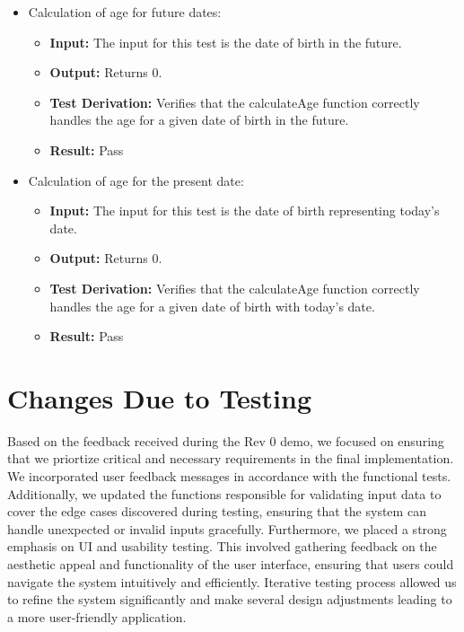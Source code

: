 \documentclass[12pt, titlepage]{article}
\begin{document}
\begin{itemize}
    \item Calculation of age for future dates:
      \begin{itemize}
        \item \textbf{Input:} The input for this test is the date of birth in the future.    
        \item \textbf{Output:} Returns 0.
        \item \textbf{Test Derivation:} Verifies that the calculateAge function correctly handles the age for a given date of birth in the future.
        \item \textbf{Result:} Pass
      \end{itemize}

    \item Calculation of age for the present date:
      \begin{itemize}
        \item \textbf{Input:} The input for this test is the date of birth representing today's date.    
        \item \textbf{Output:} Returns 0.
        \item \textbf{Test Derivation:} Verifies that the calculateAge function correctly handles the age for a given date of birth with today's date.
        \item \textbf{Result:} Pass
      \end{itemize}
  \end{itemize}


\section{Changes Due to Testing}

Based on the feedback received during the Rev 0 demo, we focused on ensuring that we priortize critical and necessary requirements in the final implementation. We incorporated user feedback messages in accordance with the functional tests. Additionally, we updated the functions responsible for validating input data to cover the edge cases discovered during testing, ensuring that the system can handle unexpected or invalid inputs gracefully. Furthermore, we placed a strong emphasis on UI and usability testing. This involved gathering feedback on the aesthetic appeal and functionality of the user interface, ensuring that users could navigate the system intuitively and efficiently. Iterative testing process allowed us to refine the system significantly and make several design adjustments leading to a more user-friendly application.
\end{document}
